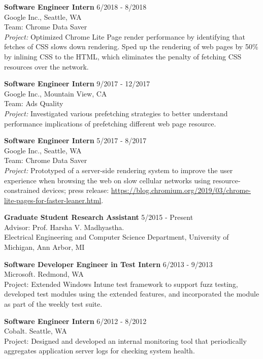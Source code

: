 \documentclass[zhemargin]{res}
\begin{document}
\begin{resume}
    \textbf{Software Engineer Intern} \hfill 6/2018 - 8/2018 \\
    Google Inc., Seattle, WA\\
    Team: Chrome Data Saver \\
    \emph{Project:} Optimized Chrome Lite Page render performance by
    identifying that fetches of CSS slows down rendering.
    Sped up the rendering of web pages by 50\% by inlining CSS to the HTML,
    which eliminates the penalty of fetching CSS resources over the network.

    \textbf{Software Engineer Intern} \hfill 9/2017 - 12/2017 \\
    Google Inc., Mountain View, CA\\
    Team: Ads Quality \\
    \emph{Project:} Investigated various prefetching strategies to better
    understand performance implications of prefetching different web page resource.

    \textbf{Software Engineer Intern} \hfill 5/2017 - 8/2017 \\
    Google Inc., Seattle, WA\\
    Team: Chrome Data Saver \\
    \emph{Project:} Prototyped of a server-side rendering system to improve the
    user experience when browsing the web on slow cellular networks using
    resource-constrained devices; press release:
    \url{https://blog.chromium.org/2019/03/chrome-lite-pages-for-faster-leaner.html}.

    \textbf{Graduate Student Research Assistant} \hfill 5/2015 - Present \\
    Advisor: Prof. Harsha V. Madhyastha.\\
    Electrical Engineering and Computer Science Department, University of Michigan, Ann Arbor, MI

    \textbf{Software Developer Engineer in Test Intern} \hfill 6/2013 - 9/2013 \\
    Microsoft. Redmond, WA\\
    Project: Extended Windows Intune test framework to support fuzz testing, developed test modules
    using the extended features, and incorporated the module as part of the weekly test suite.

    \textbf{Software Engineer Intern} \hfill 6/2012 - 8/2012 \\
    Cobalt. Seattle, WA\\
    Project: Designed and developed an internal monitoring tool that periodically aggregates application server logs for checking system health.



\end{resume}
\end{document}
